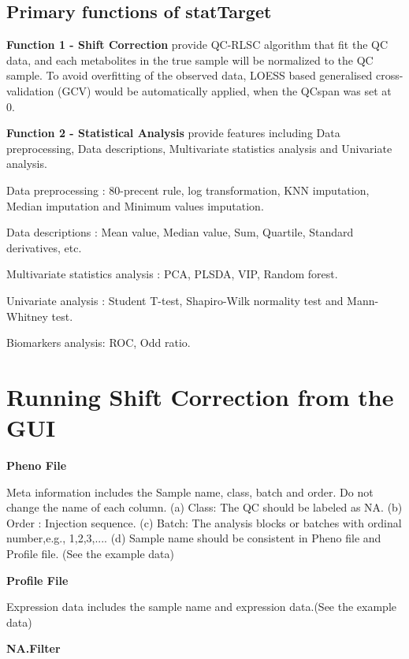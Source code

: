 \documentclass[english]{article}
\begin{document}
\subsection[Primary functions of statTarget]{Primary functions of statTarget}


 
\textbf{Function 1 - Shift Correction} provide QC-RLSC algorithm 
that fit the QC data, 
and each metabolites in the true sample will be normalized to the QC sample.
To avoid overfitting of the observed data, LOESS based generalised 
cross-validation (GCV) would be automatically applied, 
when the QCspan was set at 0. 




\textbf{Function 2 - Statistical Analysis} provide features including Data preprocessing,
Data descriptions, Multivariate statistics analysis and Univariate analysis.


Data preprocessing : 80-precent rule, log transformation, KNN imputation, 
Median imputation and Minimum values imputation.


Data descriptions :  Mean value, Median value, Sum, Quartile, Standard 
derivatives, etc.


Multivariate statistics analysis : PCA, PLSDA, VIP, Random forest.


Univariate analysis : Student T-test, Shapiro-Wilk normality test and 
Mann-Whitney test.


Biomarkers analysis: ROC, Odd ratio.


\section[Running Shift Correction from the GUI]{
Running Shift Correction from the GUI}




\textbf{Pheno File}
  
  
  Meta information includes the Sample name, class, batch and order. 
  Do not change the name of each column. 
  (a) Class: The QC should be labeled as NA. 
  (b) Order : Injection sequence. 
  (c) Batch: The analysis blocks or batches with ordinal number,e.g., 1,2,3,.... 
  (d) Sample name should be consistent in Pheno file and Profile file. 
  (See the example data)


\textbf{Profile File}


Expression data includes the sample name and expression
data.(See the example data)


\textbf{NA.Filter}
\end{document}
